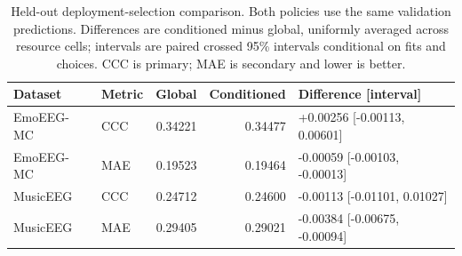 \begin{table}[t]
\centering\small
\caption{Held-out deployment-selection comparison. Both policies use the same validation predictions. Differences are conditioned minus global, uniformly averaged across resource cells; intervals are paired crossed 95\% intervals conditional on fits and choices. CCC is primary; MAE is secondary and lower is better.}
\label{tab:selection-utility}
\begin{tabular}{@{}llrrl@{}}
\toprule
Dataset & Metric & Global & Conditioned & Difference [interval] \\
\midrule
EmoEEG-MC & CCC & 0.34221 & 0.34477 & +0.00256 [-0.00113, 0.00601] \\
EmoEEG-MC & MAE & 0.19523 & 0.19464 & -0.00059 [-0.00103, -0.00013] \\
MusicEEG & CCC & 0.24712 & 0.24600 & -0.00113 [-0.01101, 0.01027] \\
MusicEEG & MAE & 0.29405 & 0.29021 & -0.00384 [-0.00675, -0.00094] \\
\bottomrule
\end{tabular}
\end{table}
